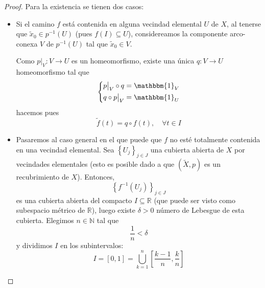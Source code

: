 \documentclass{article}
\theoremstyle{largebreak}
\newcommand\cf[3]{\ensuremath{#1:#2\rightarrow#3}}
\newcommand{\bbm}[1]{\ensuremath{\mathbbm{#1}}}
\begin{document}
    \begin{proof}
        Para la existencia se tienen dos casos:
        \begin{itemize}
            \item Si el camino $f$ está contenida en alguna vecindad elemental $U$ de $X$, al tenerse que $\widetilde{x}_0\in p^{-1}(U)$ (pues $f(I)\subseteq U$), considereamos la componente arco-conexa $V$ de $p^{-1}(U)$ tal que $\widetilde{x}_0\in V$.
            
            Como $\cf{p\big|_{V}}{V}{U}$ es un homeomorfismo, existe una única $\cf{q}{V}{U}$ homeomorfismo tal que
            \begin{equation*}
                \left\{
                    \begin{split}
                        p\big|_{V} \circ q & = \bbm{1}_{V} \\
                        q \circ p\big|_{V} & = \bbm{1}_{U} \\
                    \end{split}
                \right.
            \end{equation*}
            hacemos pues
            \begin{equation*}
                \widetilde{f}(t)=q\circ f(t),\quad\forall t\in I
            \end{equation*}
            \item Pasaremos al caso general en el que puede que $f$ no esté totalmente contenida en una vecindad elemental. Sea $\left\{U_j\right\}_{j\in J}$ una cubierta abierta de $X$ por vecindades elementales (esto es posible dado a que $(\widetilde{X},p)$ es un recubrimiento de $X$). Entonces,
            \begin{equation*}
                \left\{f^{-1}(U_j) \right\}_{ j\in J}
            \end{equation*}
            es una cubierta abierta del compacto $I\subseteq\mathbb{R}$ (que puede ser visto como subespacio métrico de $\mathbb{R}$), luego existe $\delta>0$ número de Lebesgue de esta cubierta. Elegimos $n\in\mathbb{N}$ tal que
            \begin{equation*}
                \frac{1}{n}<\delta
            \end{equation*}
            y dividimos $I$ en los subintervalos:
            \begin{equation*}
                I=[0,1]=\bigcup_{ k=1}^n \left[\frac{k-1}{n},\frac{k}{n} \right]
            \end{equation*}

\end{itemize}
\end{proof}
\end{document}
